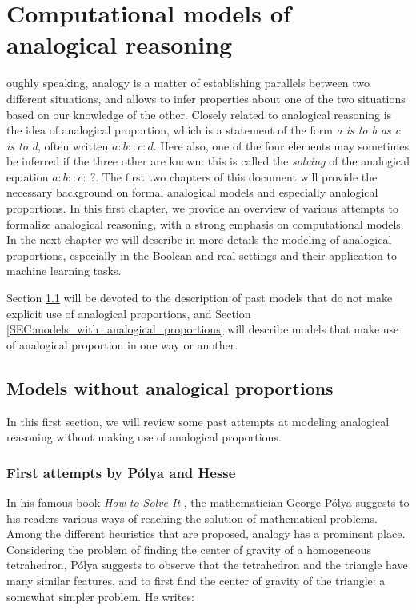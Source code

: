 \chapter{Computational models of analogical reasoning}
\label{CHAP:computational_models_of_analogical_reasoning}
\renewcommand{\contentsname}{Content}
\localtableofcontents*
\vspace*{\baselineskip}

oughly speaking, analogy is a matter of establishing parallels
between two different situations, and allows to infer properties about one of
the two situations based on our knowledge of the other. Closely related to
analogical reasoning is the idea of analogical proportion, which is a statement
of the form \textit{a is to b as c is to d}, often written $a:b::c:d$. Here
also, one of the four elements may sometimes be inferred if the three other are
known: this is called the \textit{solving} of the analogical equation
$a:b::c:~?$. The first two chapters of this document will provide
the necessary background on formal analogical models and especially analogical
proportions. In this first chapter, we provide an overview of various attempts
to formalize analogical reasoning, with a strong emphasis on computational
models. In the next chapter we will describe in more details the modeling of
analogical proportions, especially in the Boolean and real settings and their
application to machine learning tasks.

Section \ref{SEC:models_without_proportions} will be devoted to the description
of past models that do not make explicit use of analogical proportions, and
Section \ref{SEC:models_with_analogical_proportions} will describe models that
make use of analogical proportion in one way or another.

\section{Models without analogical proportions}
\label{SEC:models_without_proportions}

In this first section, we will review some past attempts at modeling analogical
reasoning without making use of analogical proportions.

\subsection{First attempts by P\'olya and Hesse}

In his famous book \textit{How to Solve It} \cite{Pol45}, the mathematician
George P\'olya suggests to his readers various ways of reaching the solution
of mathematical problems. Among the different heuristics that are
proposed, analogy has a prominent place. Considering the problem of finding
the center of gravity of a homogeneous tetrahedron, P\'olya suggests to observe
that the tetrahedron and the triangle have many similar features, and to first
find the center of gravity of the triangle: a somewhat simpler problem. He
writes:


